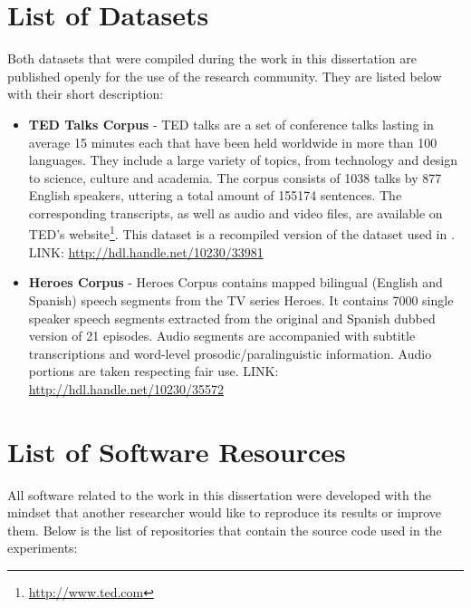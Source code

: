 \section{List of Datasets}
\label{conclusions:datasets}
Both datasets that were compiled during the work in this dissertation are published openly for the use of the research community. They are listed below with their short description:

\begin{itemize}
    \item \textbf{TED Talks Corpus} - TED talks are a set of conference talks lasting in average 15 minutes each that have been held worldwide in more than 100 languages. They include a large variety of topics, from technology and design to science, culture and academia. The corpus consists of 1038 talks by 877 English speakers, uttering a total amount of 155174 sentences. The corresponding transcripts, as well as audio and video files, are available on TED's website\footnote{\url{http://www.ted.com}}. This dataset is a recompiled version of the dataset used in \cite{Farrus:SP:2016}.
    LINK: \url{http://hdl.handle.net/10230/33981}
    
    \item \textbf{Heroes Corpus} - Heroes Corpus contains mapped bilingual (English and Spanish) speech segments from the TV series Heroes. It contains 7000 single speaker speech segments extracted from the original and Spanish dubbed version of 21 episodes. Audio segments are accompanied with subtitle transcriptions and word-level prosodic/paralinguistic information. Audio portions are taken respecting fair use. 
    LINK: \url{http://hdl.handle.net/10230/35572}
\end{itemize}

\section{List of Software Resources}
\label{conclusions:software}

All software related to the work in this dissertation were developed with the mindset that another researcher would like to reproduce its results or improve them. Below is the list of repositories that contain the source code used in the experiments:

